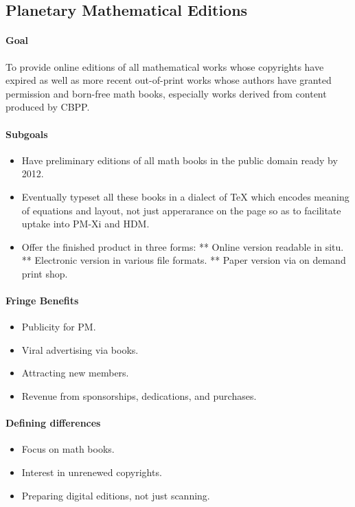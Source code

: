 \begin{itemize}
\begin{itemize}
\subsection{Planetary Mathematical Editions}

\paragraph{Goal} To provide online editions of all mathematical works whose
copyrights have expired as well as more recent out-of-print works whose
authors have granted permission and born-free math books, especially
works derived from content produced by CBPP.

\paragraph{Subgoals}

\begin{itemize}
\item
  Have preliminary editions of all math books in the public domain ready
  by 2012.
\item
  Eventually typeset all these books in a dialect of TeX which encodes
  meaning of equations and layout, not just apperarance on the page so
  as to facilitate uptake into PM-Xi and HDM.
\item
  Offer the finished product in three forms: ** Online version readable
  in situ. ** Electronic version in various file formats. ** Paper
  version via on demand print shop.
\end{itemize}

\paragraph{Fringe Benefits}

\begin{itemize}
\item
  Publicity for PM.
\item
  Viral advertising via books.
\item
  Attracting new members.
\item
  Revenue from sponsorships, dedications, and purchases.
\end{itemize}

\paragraph{Defining differences}

\begin{itemize}
\item
  Focus on math books.
\item
  Interest in unrenewed copyrights.
\item
  Preparing digital editions, not just scanning.
\end{itemize}


\end{itemize}
\end{itemize}
